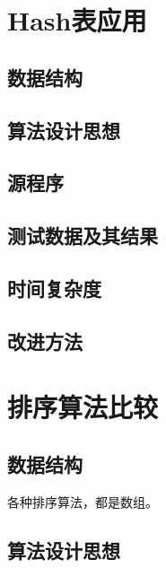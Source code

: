 \documentclass[a4paper,11pt,UTF8]{ctexart}
\begin{document}
\section{Hash表应用}
\subsection{数据结构}
\subsection{算法设计思想}
\subsection{源程序}
\subsection{测试数据及其结果}
\subsection{时间复杂度}
\subsection{改进方法}

\section{排序算法比较}
\subsection{数据结构}
各种排序算法，都是数组。
\subsection{算法设计思想}
\end{document}
